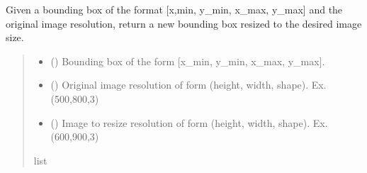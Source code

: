 \documentclass[letterpaper,10pt,english]{sphinxmanual}
\begin{document}
\begin{fulllineitems}
\begin{fulllineitems}
\begin{quote}
\begin{description}
\end{description}\end{quote}

\end{fulllineitems}


\begin{fulllineitems}
\label{\detokenize{comp_viz.utils:comp_viz.utils.toolbox.ObjectDetection.resize_bbox}}
\pysigstartsignatures
{}
\pysigstopsignatures
\sphinxAtStartPar
Given a bounding box of the format {[}x,min, y\_min, x\_max, y\_max{]} and the original image resolution, return a new bounding box resized to the desired image size.
\begin{quote}\begin{description}
\begin{itemize}
\item {} 
\sphinxAtStartPar
{} () \textendash{} Bounding box of the form {[}x\_min, y\_min, x\_max, y\_max{]}.

\item {} 
\sphinxAtStartPar
{} () \textendash{} Original image resolution of form (height, width, shape). Ex. (500,800,3)

\item {} 
\sphinxAtStartPar
{} () \textendash{} Image to resize resolution of form (height, width, shape). Ex. (600,900,3)

\end{itemize}

\sphinxAtStartPar
list

\end{description}\end{quote}


\end{fulllineitems}
\end{fulllineitems}
\end{document}
